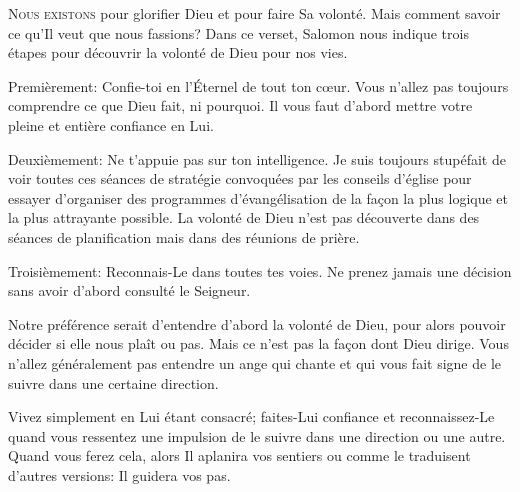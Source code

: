 

\lettrine{N}{ous existons} pour glorifier Dieu et pour faire Sa volonté.
 Mais comment savoir ce qu'Il veut que nous fassions?
 Dans ce verset, Salomon nous indique trois étapes pour découvrir
 la volonté de Dieu pour nos vies. 

Premièrement: \Og Confie-toi en l'Éternel de tout ton c\oe{}ur. \Fg{}
 Vous n'allez pas toujours comprendre ce que Dieu fait, ni pourquoi.
 Il vous faut d'abord mettre votre pleine et entière confiance en Lui. 

Deuxièmement: \Og Ne t'appuie pas sur ton intelligence. \Fg{}
 Je suis toujours stupéfait de voir toutes ces séances de stratégie
 convoquées par les conseils d'église pour essayer d'organiser
 des programmes d'évangélisation de la fa\c{c}on la plus logique
 et la plus attrayante possible.
 La volonté de Dieu n'est pas découverte dans des séances
 de planification mais dans des réunions de prière. 

Troisièmement: \Og Reconnais-Le dans toutes tes voies. \Fg{}
 Ne prenez jamais une décision sans avoir d'abord consulté le Seigneur. 


Notre préférence serait d'entendre d'abord la volonté de Dieu, 
 pour alors pouvoir décider si elle nous plaît ou pas. 
 Mais ce n'est pas la fa\c{c}on dont Dieu dirige.
 Vous n'allez généralement pas entendre un ange qui chante
 et qui vous fait signe de le suivre dans une certaine direction. 

Vivez simplement en Lui étant consacré; faites-Lui confiance
 et reconnaissez-Le quand vous ressentez une impulsion de le suivre
 dans une direction ou une autre.
 Quand vous ferez cela, alors \Og Il aplanira vos sentiers \Fg{}
 ou comme le traduisent d'autres versions: 
 \Og Il guidera vos pas. \Fg{}

\dvrule



